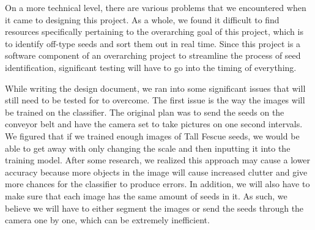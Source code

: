 \documentclass[onecolumn, draftclsnofoot,10pt, compsoc]{IEEEtran}
\begin{document}
	On a more technical level, there are various problems that we encountered when it came to designing this project. As a whole, we found it difficult to find resources specifically pertaining to the overarching goal of this project, which is to identify off-type seeds and sort them out in real time. Since this project is a software component of an overarching project to streamline the process of seed identification, significant testing will have to go into the timing of everything. 
	
	While writing the design document, we ran into some significant issues that will still need to be tested for to overcome. The first issue is the way the images will be trained on the classifier. The original plan was to send the seeds on the conveyor belt and have the camera set to take pictures on one second intervals. We figured that if we trained  enough images of Tall Fescue seeds, we would be able to get away with only changing the scale and then inputting it into the training model. After some research, we realized this approach may cause a lower accuracy because more objects in the image will cause increased clutter and give more chances for the classifier to produce errors. In addition, we will also have to make sure that each image has the same amount of seeds in it. As such, we believe we will have to either segment the images or send the seeds through the camera one by one, which can be extremely inefficient. 
	
\end{document}
